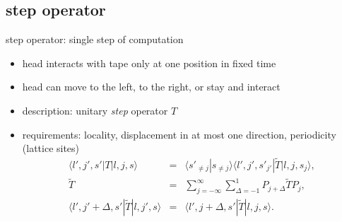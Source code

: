 \documentclass{beamer}
\begin{document}
\subsection{step operator}
\begin{frame}
    \begin{block}{step operator: single step of computation}
	    \begin{itemize}
    	    \item head interacts with tape only at one position in fixed time
        	\item head can move to the left, to the right, or stay and interact
	        \item description: unitary \emph{step} operator $T$
    	    \item requirements: locality, displacement in at most one direction,
    	    periodicity (lattice sites)
        	\begin{eqnarray*}
            	\langle l',j',s'|T|l,j,s\rangle&=&\langle s'_{\neq j}|s_{\neq j}\rangle\langle
            	l',j',s'_{j'}|\tilde{T}|l,j,s_j\rangle,\\
            	\tilde{T}&=&\sum_{j=-\infty}^\infty\sum_{\Delta=-1}^1
            	P_{j+\Delta}\tilde{T}P_j,\\
            	\langle
            	l',j'+\Delta,s'|\tilde{T}|l,j',s\rangle&=&\langle
            	l',j+\Delta,s'|\tilde{T}|l,j,s\rangle.
        	\end{eqnarray*}
    	\end{itemize}
    \end{block}
\end{frame}
%
\end{document}
